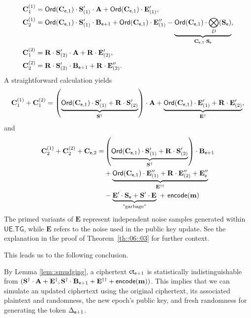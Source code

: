 \documentclass{fundam}
\begin{document}
\begin{align*}
	 \mathbf{C}_{1}^{(1)} &= \mathsf{Ord}(\mathbf{C}_{\mathsf{e} , 1})\cdot\mathbf{S}_{(1)}'  \cdot \mathbf{A} + \mathsf{Ord}(\mathbf{C}_{\mathsf{e} , 1})\cdot \mathbf{E}_{(1)}' ,     \\
	 \mathbf{C}_{2}^{(1)} &=   \mathsf{Ord}(\mathbf{C}_{\mathsf{e} , 1})\cdot \mathbf{S}_{(1)}' \cdot \mathbf{B}_{\mathsf{e}+1} + \mathsf{Ord}(\mathbf{C}_{\mathsf{e} , 1})\cdot \mathbf{E}_{(1)}''  -   \underbrace{\mathsf{Ord}(\mathbf{C}_{\mathsf{e} , 1})\cdot \bigotimes_{D} (\mathbf{S}_{\mathsf{e}}) }_{\mathbf{C}_{\mathsf{e} , 1}\cdot \mathbf{S}_{\mathsf{e}}}, \\
	 	\mathbf{C}_{1}^{(2)} &= \mathbf{R}\cdot \mathbf{S}_{(2)}' \cdot \mathbf{A} + \mathbf{R}\cdot \mathbf{E}_{(2)}'  ,\\
	 \mathbf{C}_{2}^{(2)} &= \mathbf{R}\cdot \mathbf{S}_{(2)}' \cdot \mathbf{B}_{\mathsf{e}+1} + \mathbf{R}\cdot \mathbf{E}_{(2)}''.
\end{align*}
A straightforward calculation yields
\begin{align*}
 \mathbf{C}_{1}^{(1)} + \mathbf{C}_{1}^{(2)}  = \left(  \underbrace{\mathsf{Ord}(\mathbf{C}_{\mathsf{e} , 1})\cdot \mathbf{S}_{(1)}'  +  \mathbf{R}\cdot \mathbf{S}_{(2)}' }_{\mathbf{S}^{\dagger}}  \right) \cdot \mathbf{A}  + \underbrace{\mathsf{Ord}(\mathbf{C}_{\mathsf{e} , 1})\cdot \mathbf{E}_{(1)}' + \mathbf{R}\cdot \mathbf{E}_{(2)}' }_{\mathbf{E}^{\dagger}} ,
\end{align*}
and
\begin{align*}
 \mathbf{C}_{2}^{(1)}  +  \mathbf{C}_{2}^{(2)}  + \mathbf{C}_{\mathsf{e},2}  = & \left(  \underbrace{\mathsf{Ord}(\mathbf{C}_{\mathsf{e} , 1})\cdot \mathbf{S}_{(1)}'  +  \mathbf{R}\cdot \mathbf{S}_{(2)}' }_{\mathbf{S}^{\dagger}}  \right) \cdot \mathbf{B}_{\mathsf{e}+1} \\
 & + \underbrace{\mathsf{Ord}(\mathbf{C}_{\mathsf{e} , 1})\cdot \mathbf{E}_{(1)}'' + \mathbf{R}\cdot \mathbf{E}_{(2)}'' +\mathbf{E}_{\mathsf{e}}''}_{\mathbf{E}^{\dagger\dagger}} \\
 &- \underbrace{\mathbf{E}'\cdot \mathbf{S}_{\mathsf{e}} + \mathbf{S}' \cdot \mathbf{E}}_{\text{''garbage''}}~ +  ~\mathsf{encode}(\mathbf{m})
\end{align*}
%
The primed variants of $\mathbf{E}$ represent independent noise samples generated within $\mathsf{UE.TG}$, while $\mathbf{E}$ refers to the noise used in the public key update. See the explanation in the proof of Theorem~\ref{th::06::03} for further context.

\vspace{0.3cm}
\noindent This leads us to the following conclusion.
\begin{concl}\label{conc::01}
	By Lemma \ref{lem::smudging},  a ciphertext $\mathsf{ct}_{\mathsf{e}+1}$ is statistically indistinguishable from $(\mathbf{S}^{\dagger}\cdot\mathbf{A} + \mathbf{E}^{\dagger},  \mathbf{S}^{\dagger}\cdot\mathbf{B}_{\mathsf{e}+1} + \mathbf{E}^{\dagger\dagger} +  \mathsf{encode}(\mathbf{m}))$. This implies that we can simulate an updated ciphertext using the original ciphertext, its associated plaintext and randomness, the new epoch's public key, and fresh randomness for generating the token $\Delta_{\mathsf{e}+1}$.
\end{concl}
\end{document}
